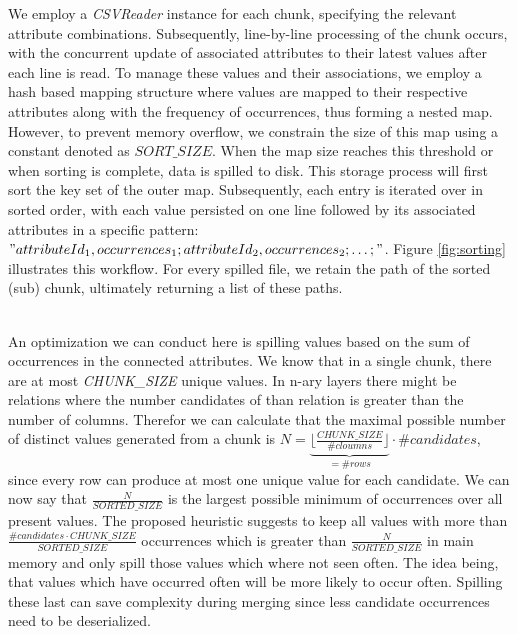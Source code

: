 We employ a \textit{CSVReader} instance for each chunk, specifying the relevant attribute combinations. Subsequently, line-by-line processing of the chunk occurs, with the concurrent update of associated attributes to their latest values after each line is read. To manage these values and their associations, we employ a hash based mapping structure where values are mapped to their respective attributes along with the frequency of occurrences, thus forming a nested map. However, to prevent memory overflow, we constrain the size of this map using a constant denoted as $SORT\_SIZE$. When the map size reaches this threshold or when sorting is complete, data is spilled to disk. This storage process will first sort the key set of the outer map. Subsequently, each entry is iterated over in sorted order, with each value persisted on one line followed by its associated attributes in a specific pattern: $"attributeId_1,occurrences_1;attributeId_2,occurrences_2;\dots;"$. Figure \ref{fig:sorting} illustrates this workflow. For every spilled file, we retain the path of the sorted (sub) chunk, ultimately returning a list of these paths.

\noindent \\ An optimization we can conduct here is spilling values based on the sum of occurrences in the connected attributes. We know that in a single chunk, there are at most \textit{CHUNK\_SIZE} unique values. In n-ary layers there might be relations where the number candidates of than relation is greater than the number of columns. Therefor we can calculate that the maximal possible number of distinct values generated from a chunk is $N = \underbrace{\lfloor \frac{CHUNK\_SIZE}{\#cloumns} \rfloor}_{= \#rows} \cdot \#candidates$, since every row can produce at most one unique value for each candidate. We can now say that $\frac{N}{SORTED\_SIZE}$ is the largest possible minimum of occurrences over all present values. The proposed heuristic suggests to keep all values with more than $\frac{\#candidates \cdot CHUNK\_SIZE}{SORTED\_SIZE}$ occurrences which is greater than $\frac{N}{SORTED\_SIZE}$ in main memory and only spill those values which where not seen often. The idea being, that values which have occurred often will be more likely to occur often. Spilling these last can save complexity during merging since less candidate occurrences need to be deserialized.

